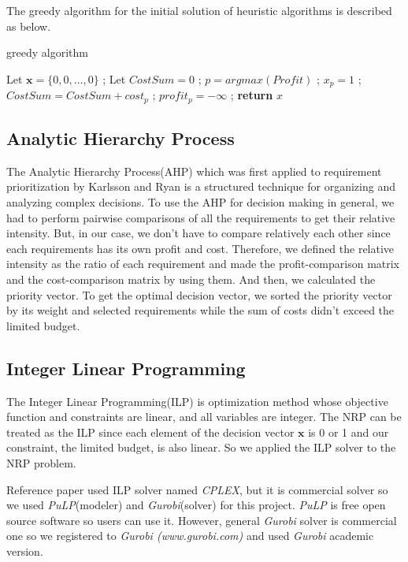The greedy algorithm for the initial solution of heuristic algorithms is described as below. 

\begin{algorithm}
\caption{greedy algorithm}\label{alg:greedy}
\begin{algorithmic}
    \State Let $\textbf{x} = \{0, 0, \ldots, 0\}$ ;
    \State Let $CostSum = 0$ ;
        \State $p = argmax(Profit)$ ;
            \State $x_p = 1$ ;
            \State $CostSum = CostSum + cost_p$ ;
        \EndIf
        \State $profit_p = -\infty$ ;
    \EndFor
    \textbf{return} $x$
\end{algorithmic}
\end{algorithm}


\subsection{Analytic Hierarchy Process}
The Analytic Hierarchy Process(AHP) which was first applied to requirement prioritization by Karlsson and Ryan\cite{AHP} is a structured technique for organizing and analyzing complex decisions. To use the AHP for decision making in general, we had to perform pairwise comparisons of all the requirements to get their relative intensity. But, in our case, we don't have to compare relatively each other since each requirements has its own profit and cost. Therefore, we defined the relative intensity as the ratio of each requirement and made the profit-comparison matrix and the cost-comparison matrix by using them. And then, we calculated the priority vector. To get the optimal decision vector, we sorted the priority vector by its weight and selected requirements while the sum of costs didn't exceed the limited budget.


\subsection{Integer Linear Programming}
The Integer Linear Programming(ILP) is optimization method whose objective function and constraints are linear, and all variables are integer. The NRP can be treated as the ILP since each element of the decision vector $\textbf{x}$ is 0 or 1 and our constraint, the limited budget, is also linear. So we applied the ILP solver to the NRP problem.

Reference paper\cite{ILP} used ILP solver named \textit{CPLEX}, but it is commercial solver so we used \textit{PuLP}(modeler) and \textit{Gurobi}(solver) for this project. \textit{PuLP} is free open source software so users can use it. However, general \textit{Gurobi} solver is commercial one so we registered to \textit{Gurobi (www.gurobi.com)} and used \textit{Gurobi} academic version.

